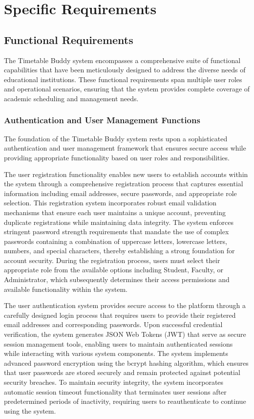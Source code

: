 \chapter{Specific Requirements}

\section{Functional Requirements}

The Timetable Buddy system encompasses a comprehensive suite of functional capabilities that have been meticulously designed to address the diverse needs of educational institutions. These functional requirements span multiple user roles and operational scenarios, ensuring that the system provides complete coverage of academic scheduling and management needs.

\subsection{Authentication and User Management Functions}

The foundation of the Timetable Buddy system rests upon a sophisticated authentication and user management framework that ensures secure access while providing appropriate functionality based on user roles and responsibilities.

The user registration functionality enables new users to establish accounts within the system through a comprehensive registration process that captures essential information including email addresses, secure passwords, and appropriate role selection. This registration system incorporates robust email validation mechanisms that ensure each user maintains a unique account, preventing duplicate registrations while maintaining data integrity. The system enforces stringent password strength requirements that mandate the use of complex passwords containing a combination of uppercase letters, lowercase letters, numbers, and special characters, thereby establishing a strong foundation for account security. During the registration process, users must select their appropriate role from the available options including Student, Faculty, or Administrator, which subsequently determines their access permissions and available functionality within the system.

The user authentication system provides secure access to the platform through a carefully designed login process that requires users to provide their registered email addresses and corresponding passwords. Upon successful credential verification, the system generates JSON Web Tokens (JWT) that serve as secure session management tools, enabling users to maintain authenticated sessions while interacting with various system components. The system implements advanced password encryption using the bcrypt hashing algorithm, which ensures that user passwords are stored securely and remain protected against potential security breaches. To maintain security integrity, the system incorporates automatic session timeout functionality that terminates user sessions after predetermined periods of inactivity, requiring users to reauthenticate to continue using the system.

